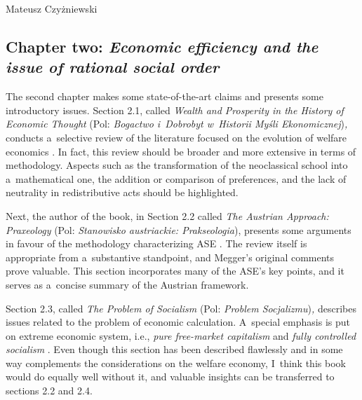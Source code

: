 \begin{newrevengenv}{Mateusz Czyżniewski}
\subsection{Chapter two: \textit{Economic efficiency and the issue of rational social order}}



The second chapter makes some state-of-the-art claims and presents some introductory issues. Section 2.1, called \textit{Wealth and Prosperity in the History of Economic Thought} (Pol: \textit{Bogactwo i~Dobrobyt w~Historii Myśli Ekonomicznej})\textit{,} conducts a~selective review of the literature focused on the evolution of welfare economics 
\parencite[][pp.25–34]{megger_sprawiedliwosc_2021}. %
 In fact, this review should be broader and more extensive in terms of methodology. Aspects such as the transformation of the neoclassical school into a~mathematical one, the addition or comparison of preferences, and the lack of neutrality in redistributive acts should be highlighted.



Next, the author of the book, in Section 2.2 called \textit{The Austrian Approach: Praxeology} (Pol: \textit{Stanowisko austriackie: Prakseologia}), presents some arguments in favour of the methodology characterizing ASE 
\parencite[][pp.34–43]{megger_sprawiedliwosc_2021}. %
 The review itself is appropriate from a~substantive standpoint, and Megger's original comments prove valuable. This section incorporates many of the ASE's key points, and it serves as a~concise summary of the Austrian framework.



Section 2.3, called \textit{The Problem of Socialism} (Pol: \textit{Problem Socjalizmu})\textit{,} describes issues related to the problem of economic calculation. A~special emphasis is put on extreme economic system, i.e., \textit{pure free-market capitalism} and \textit{fully controlled socialism} 
\parencite[][pp.43–49]{megger_sprawiedliwosc_2021}. %
 Even though this section has been described flawlessly and in some way complements the considerations on the welfare economy, I~think this book would do equally well without it, and valuable insights can be transferred to sections 2.2 and 2.4.




\end{newrevengenv}
